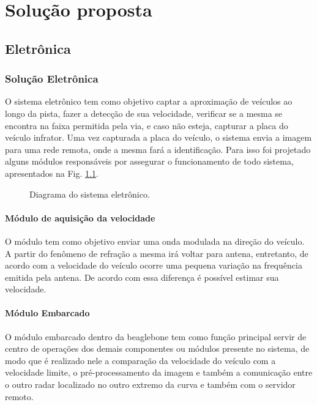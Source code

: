 \chapter{Solução proposta}
\section{Eletrônica}


\subsection{Solução Eletrônica}
O sistema eletrônico tem como objetivo captar a aproximação de veículos ao longo da pista, fazer a detecção de sua velocidade, verificar se a mesma se encontra na faixa permitida pela via, e caso não esteja, capturar a placa do veículo infrator. Uma vez capturada a placa do veículo, o sistema envia a imagem para uma rede remota, onde a mesma fará a identificação. Para isso foi projetado alguns módulos responsáveis por assegurar o funcionamento de todo sistema, apresentados na Fig. \ref{fig:sistemacompleto}.

\begin{figure}[h]
	\caption{\label{fig:sistemacompleto} Diagrama do sistema eletrônico.}
\end{figure}


\subsubsection{Módulo de aquisição da velocidade}
 O módulo tem como objetivo enviar uma onda modulada na direção do veículo. A partir do fenômeno de refração a mesma irá voltar para antena, entretanto, de acordo com a velocidade do veículo ocorre uma pequena variação na frequência emitida pela antena. De acordo com essa diferença é possível estimar sua velocidade. 


\subsubsection{Módulo Embarcado}

O módulo embarcado dentro da beaglebone tem como função principal servir de centro de operações dos demais componentes ou módulos presente no sistema, de modo que é realizado nele a comparação da velocidade do veículo com a velocidade limite, o pré-processamento da imagem e também a comunicação entre o outro radar localizado no outro extremo da curva e também com o servidor remoto. 

